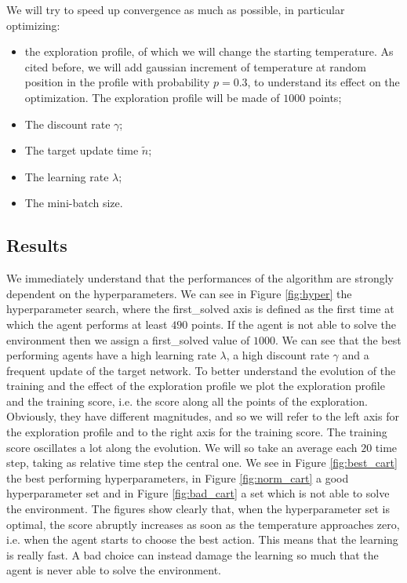 We will try to speed up convergence as much as possible, in particular optimizing:
\begin{itemize}
    \item the exploration profile, of which we will change the starting temperature. As cited before, we will add gaussian increment of temperature at random position 
        in the profile with probability $p=0.3$, to understand its effect on the optimization. The exploration profile will be made of $1000$ points;
    \item The discount rate $\gamma$;
    \item The target update time $\tilde{n}$;
    \item The learning rate $\lambda$;
    \item The mini-batch size.
\end{itemize}

\subsection{Results}

We immediately understand that the performances of the algorithm are strongly dependent on the hyperparameters. We can see in Figure \ref{fig:hyper} the 
hyperparameter search, where the first\_solved axis is defined as the first time at which the agent performs at least $490$ points. If the agent is not able 
to solve the environment then we assign a first\_solved value of $1000$. We can see that the best performing agents have a high learning rate $\lambda$, a high 
discount rate $\gamma$ and a frequent update of the target network.
To better understand the evolution of the training and the effect of the exploration profile we plot the exploration profile and the training score, i.e. the score 
along all the points of the exploration. Obviously, they have different magnitudes, and so we will refer to the left axis for the exploration profile and to 
the right axis for the training score. The training score oscillates a lot along the evolution. We will so take an average each $20$ time step, taking as relative time step 
the central one. We see in Figure \ref{fig:best_cart} the best performing hyperparameters, in Figure \ref{fig:norm_cart} a good hyperparameter set and in Figure \ref{fig:bad_cart}
a set which is not able to solve the environment. The figures show clearly that, when the hyperparameter set is optimal, the score abruptly increases as soon as the 
temperature approaches zero, i.e. when the agent starts to choose the best action. This means that the learning is really fast. 
A bad choice can instead damage the learning so much that the agent is never able to solve the environment.